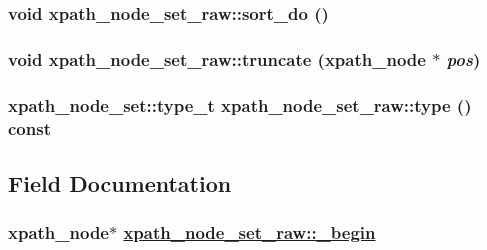 \hypertarget{classxpath__node__set__raw_5e46ee306afc24ea83f6c1181bba3600}{
\subsubsection[sort\_\-do]{\setlength{\rightskip}{0pt plus 5cm}void xpath\_\-node\_\-set\_\-raw::sort\_\-do ()}}
\label{classxpath__node__set__raw_5e46ee306afc24ea83f6c1181bba3600}


\hypertarget{classxpath__node__set__raw_ba48d228f554065702f3e6d5059f701d}{
\subsubsection[truncate]{\setlength{\rightskip}{0pt plus 5cm}void xpath\_\-node\_\-set\_\-raw::truncate (xpath\_\-node $\ast$ {\em pos})}}
\label{classxpath__node__set__raw_ba48d228f554065702f3e6d5059f701d}


\hypertarget{classxpath__node__set__raw_9c1dceb2d9a8e0747380bd12968fc9d8}{
\subsubsection[type]{\setlength{\rightskip}{0pt plus 5cm}xpath\_\-node\_\-set::type\_\-t xpath\_\-node\_\-set\_\-raw::type () const}}
\label{classxpath__node__set__raw_9c1dceb2d9a8e0747380bd12968fc9d8}




\subsection{Field Documentation}
\hypertarget{classxpath__node__set__raw_8e6071473610e8340b07a64767ef68c0}{
\subsubsection[\_\-begin]{\setlength{\rightskip}{0pt plus 5cm}xpath\_\-node$\ast$ \hyperlink{classxpath__node__set__raw_8e6071473610e8340b07a64767ef68c0}{xpath\_\-node\_\-set\_\-raw::\_\-begin}}}
\label{classxpath__node__set__raw_8e6071473610e8340b07a64767ef68c0}


